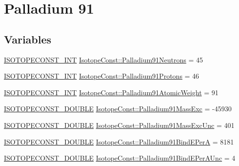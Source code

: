 \hypertarget{group___isotope_const-_palladium-_pd91}{}\section{Palladium 91}
\label{group___isotope_const-_palladium-_pd91}
\subsection*{Variables}
\begin{DoxyCompactItemize}
\item 
\mbox{\hyperlink{group___isotope_const-_macros_ga5f18360b3e99483a35c32d789e62621c}{I\+S\+O\+T\+O\+P\+E\+C\+O\+N\+S\+T\+\_\+\+I\+NT}} \mbox{\hyperlink{group___isotope_const-_palladium-_pd91_ga3c120f85d5d7c2410542a701a17e8744}{Isotope\+Const\+::\+Palladium91\+Neutrons}} = 45
\item 
\mbox{\hyperlink{group___isotope_const-_macros_ga5f18360b3e99483a35c32d789e62621c}{I\+S\+O\+T\+O\+P\+E\+C\+O\+N\+S\+T\+\_\+\+I\+NT}} \mbox{\hyperlink{group___isotope_const-_palladium-_pd91_ga3aeded8968bb29988fb188e6aabce359}{Isotope\+Const\+::\+Palladium91\+Protons}} = 46
\item 
\mbox{\hyperlink{group___isotope_const-_macros_ga5f18360b3e99483a35c32d789e62621c}{I\+S\+O\+T\+O\+P\+E\+C\+O\+N\+S\+T\+\_\+\+I\+NT}} \mbox{\hyperlink{group___isotope_const-_palladium-_pd91_ga9bc33ea162d3b106e26bd009da109fb1}{Isotope\+Const\+::\+Palladium91\+Atomic\+Weight}} = 91
\item 
\mbox{\hyperlink{group___isotope_const-_macros_ga8f45a7272ce02c0b4c65c44636ed719a}{I\+S\+O\+T\+O\+P\+E\+C\+O\+N\+S\+T\+\_\+\+D\+O\+U\+B\+LE}} \mbox{\hyperlink{group___isotope_const-_palladium-_pd91_ga39d689baeb0ba68d86ad8e2a4f06608a}{Isotope\+Const\+::\+Palladium91\+Mass\+Exc}} = -\/45930
\item 
\mbox{\hyperlink{group___isotope_const-_macros_ga8f45a7272ce02c0b4c65c44636ed719a}{I\+S\+O\+T\+O\+P\+E\+C\+O\+N\+S\+T\+\_\+\+D\+O\+U\+B\+LE}} \mbox{\hyperlink{group___isotope_const-_palladium-_pd91_ga76407b91114e83d58537211d9212f735}{Isotope\+Const\+::\+Palladium91\+Mass\+Exc\+Unc}} = 401
\item 
\mbox{\hyperlink{group___isotope_const-_macros_ga8f45a7272ce02c0b4c65c44636ed719a}{I\+S\+O\+T\+O\+P\+E\+C\+O\+N\+S\+T\+\_\+\+D\+O\+U\+B\+LE}} \mbox{\hyperlink{group___isotope_const-_palladium-_pd91_ga3cfc443dbf2258c659e5e32c4e88d64b}{Isotope\+Const\+::\+Palladium91\+Bind\+E\+PerA}} = 8181
\item 
\mbox{\hyperlink{group___isotope_const-_macros_ga8f45a7272ce02c0b4c65c44636ed719a}{I\+S\+O\+T\+O\+P\+E\+C\+O\+N\+S\+T\+\_\+\+D\+O\+U\+B\+LE}} \mbox{\hyperlink{group___isotope_const-_palladium-_pd91_gaa3736ac5212a66055fd65f782302e56a}{Isotope\+Const\+::\+Palladium91\+Bind\+E\+Per\+A\+Unc}} = 4

\end{DoxyCompactItemize}
